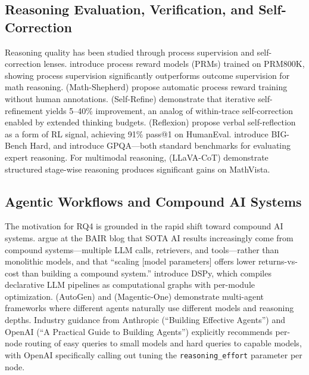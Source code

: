 \documentclass[11pt]{article}
\begin{document}
\subsection{Reasoning Evaluation, Verification, and Self-Correction}

Reasoning quality has been studied through process supervision and self-correction lenses. \citet{lightman2023verify} introduce process reward models (PRMs) trained on PRM800K, showing process supervision significantly outperforms outcome supervision for math reasoning. \citet{wang2024mathshepherd} (Math-Shepherd) propose automatic process reward training without human annotations. \citet{madaan2023selfrefine} (Self-Refine) demonstrate that iterative self-refinement yields 5--40\% improvement, an analog of within-trace self-correction enabled by extended thinking budgets. \citet{shinn2023reflexion} (Reflexion) propose verbal self-reflection as a form of RL signal, achieving 91\% pass@1 on HumanEval. \citet{suzgun2023bbh} introduce BIG-Bench Hard, and \citet{rein2023gpqa} introduce GPQA---both standard benchmarks for evaluating expert reasoning. For multimodal reasoning, \citet{xu2024llavacot} (LLaVA-CoT) demonstrate structured stage-wise reasoning produces significant gains on MathVista.

\subsection{Agentic Workflows and Compound AI Systems}

The motivation for RQ4 is grounded in the rapid shift toward compound AI systems. \citet{zaharia2024compound} argue at the BAIR blog that SOTA AI results increasingly come from compound systems---multiple LLM calls, retrievers, and tools---rather than monolithic models, and that ``scaling [model parameters] offers lower returns-vs-cost than building a compound system.'' \citet{khattab2023dspy} introduce DSPy, which compiles declarative LLM pipelines as computational graphs with per-module optimization. \citet{wu2023autogen} (AutoGen) and \citet{fourney2024magentic} (Magentic-One) demonstrate multi-agent frameworks where different agents naturally use different models and reasoning depths. Industry guidance from Anthropic (``Building Effective Agents'') and OpenAI (``A Practical Guide to Building Agents'') explicitly recommends per-node routing of easy queries to small models and hard queries to capable models, with OpenAI specifically calling out tuning the \texttt{reasoning\_effort} parameter per node.
\end{document}
